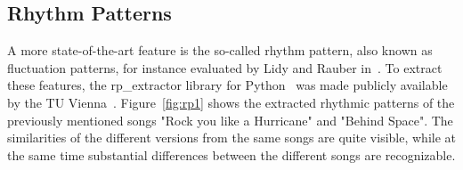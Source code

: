 \subsection{Rhythm Patterns}\label{flucpat}

A more state-of-the-art feature is the so-called rhythm pattern, also known as fluctuation patterns, for instance evaluated by Lidy and Rauber in~\cite{rp1}. 
To extract these features, the rp\_extractor library for Python~\cite{rp_extract} was made publicly available by the TU Vienna~\cite{rp_extract2}. Figure~\ref{fig:rp1} shows the extracted rhythmic patterns of the previously mentioned songs "Rock you like a Hurricane" and "Behind Space". The similarities of the different versions from the same songs are quite visible, while at the same time substantial differences between the different songs are recognizable.

